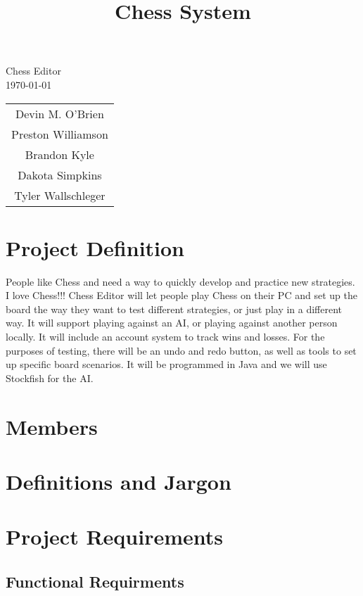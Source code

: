 \documentclass{article}
\title{Chess System}
\begin{document}
\begin{titlepage}
\begin{center}
\vspace{1cm}
\huge Chess Editor\\
\normalsize
\vspace{1cm}
\today\\
\vspace{1cm}
\begin{tabular}{c}
Devin M. O'Brien \\
Preston Williamson\\
Brandon Kyle\\
Dakota Simpkins\\
Tyler Wallschleger
\end{tabular}
\end{center}
\end{titlepage}
\section{Project Definition}
People like Chess and need a way to quickly develop and practice new strategies. I love
Chess!!! Chess Editor will let people play Chess on their PC and set up the board the
way they want to test different strategies, or just play in a different way. It will support
playing against an AI, or playing against another person locally. It will include an account
system to track wins and losses. For the purposes of testing, there will be an undo and
redo button, as well as tools to set up specific board scenarios. It will be programmed in
Java and we will use Stockfish for the AI.
\newpage
\section{Members}
\newpage
\section{Definitions and  Jargon}
\newpage
\section{Project Requirements}

\subsection{Functional Requirments}
\end{document}
